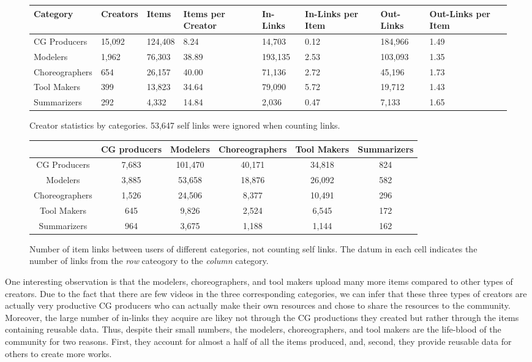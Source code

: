 \documentclass[10pt, a4paper]{article}
\begin{document}
\begin{figure}[t]
	\centering
	\begin{tabular}{C|D|D|B|D|B|D|B}
		Category & Creators & Items & Items per Creator & In-Links & In-Links per Item & Out-Links & Out-Links per Item \\
		\hline
		CG Producers & 15,092 & 124,408 & 8.24 & 14,703 & 0.12 & 184,966 & 1.49\\
		Modelers & 1,962 & 76,303 & 38.89 & 193,135 & 2.53 & 103,093 & 1.35\\
		Choreographers & 654 & 26,157 & 40.00 & 71,136 & 2.72 & 45,196 & 1.73\\
		Tool Makers & 399 & 13,823 & 34.64 & 79,090 & 5.72 & 19,712 & 1.43\\
		Summarizers & 292 & 4,332 & 14.84 & 2,036 & 0.47 & 7,133 & 1.65
	\end{tabular}
	\caption{Creator statistics by categories. 53,647 self links were ignored when counting links.}
	\label{creator-statistics-by-category}
\end{figure}

\begin{figure}[t]
\centering
\begin{tabular}{c|c|c|c|c|c}
 & CG producers & Modelers & Choreographers & Tool Makers & Summarizers \\
 \hline
CG Producers & 7,683 & 101,470 & 40,171 & 34,818 & 824 \\
Modelers & 3,885 & 53,658 & 18,876 & 26,092 & 582 \\
Choreographers & 1,526 & 24,506 & 8,377 & 10,491 & 296 \\
Tool Makers & 645 & 9,826 & 2,524 & 6,545 & 172 \\
Summarizers & 964 & 3,675 & 1,188 & 1,144 & 162 \\
\end{tabular}
\caption{Number of item links between users of different categories, not counting self links. The datum in each cell indicates the number of links from the \emph{row} cateogory to the \emph{column} category.}
\label{user-links}
\end{figure}

One interesting observation is that the modelers, choreographers, and tool makers upload many more items compared to other types of creators. Due to the fact that there are few videos in the three corresponding categories, we can infer that these three types of creators are actually very productive CG producers who can actually make their own resources and chose to share the resources to the community. Moreover, the large number of in-links they acquire are likey not through the CG productions they created but rather through the items containing reusable data. Thus, despite their small numbers, the modelers, choreographers, and tool makers are the life-blood of the community for two reasons. First, they account for almost a half of all the items produced, and, second, they provide reusable data for others to create more works.
\end{document}
